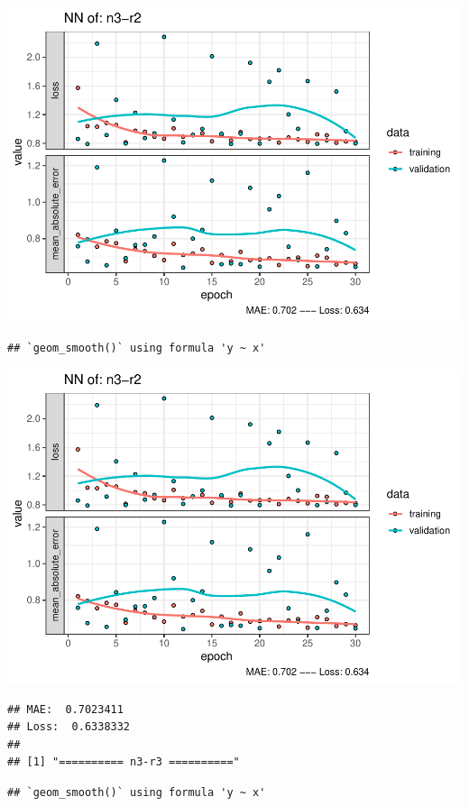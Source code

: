 \documentclass[
]{article}
\begin{document}
\includegraphics{project-code_files/figure-latex/unnamed-chunk-18-25.pdf}

\begin{verbatim}
## `geom_smooth()` using formula 'y ~ x'
\end{verbatim}

\includegraphics{project-code_files/figure-latex/unnamed-chunk-18-26.pdf}

\begin{verbatim}
## MAE:  0.7023411
## Loss:  0.6338332 
## 
## [1] "========== n3-r3 =========="
\end{verbatim}

\begin{verbatim}
## `geom_smooth()` using formula 'y ~ x'
\end{verbatim}
\end{document}
